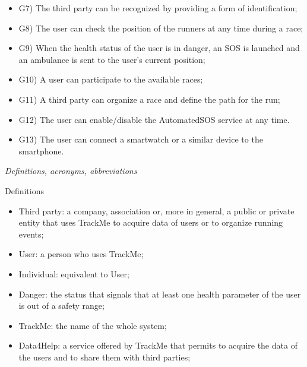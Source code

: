 \documentclass{article}
\begin{document}
\begin{legal}
\begin{legal}
\begin{legal}
{\begin{itemize}
				\item G7) The third party can be recognized by providing a form of identification;\\
				\item G8) The user can check the position of the runners at any time during a race;\\
				\item G9) When the health status of the user is in danger, an SOS is launched and an ambulance is sent to the user’s current position;\\
				\item G10) A user can participate to the available races;\\
				\item G11) A third party can organize a race and define the path for the run;\\
				\item G12) The user can enable/disable the AutomatedSOS service at any time.\\
				\item G13) The user can connect a smartwatch or a similar device to the smartphone.\\
				\end{itemize}
			}
			\end{legal}
		\item \textit{Definitions, acronyms, abbreviations}\\
			\begin{legal}
			\item Definitions\\
			{\normalfont
				\begin{itemize}
				\item Third party: a company, association or, more in general, a public or private entity that uses TrackMe to acquire data of users or to organize running events;\\
				\item User: a person who uses TrackMe;\\
				\item Individual: equivalent to User;\\
				\item Danger: the status that signals that at least one health parameter of the user is out of a safety range;\\
				\item TrackMe: the name of the whole system;\\
				\item Data4Help: a service offered by TrackMe that permits to acquire the data of the users and to share them with third parties;\\

\end{itemize}}
\end{legal}
\end{legal}
\end{legal}
\end{document}
